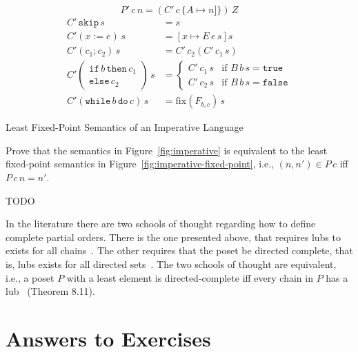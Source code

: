 \documentclass{tufte-handout}
\newcommand{\ASSIGN}[2]{#1 \mathrel{:=} #2}
\newcommand{\SEQ}[2]{#1 \mathrel{;} #2}
\newcommand{\SKIP}[0]{\mathtt{skip}}
\newcommand{\WHILE}[2]{\mathtt{while}\,#1\,\mathtt{do}\,#2}
\newcommand{\TRUE}[0]{\mathtt{true}}
\newcommand{\FALSE}[0]{\mathtt{false}}
\begin{document}
\begin{marginfigure}
\[
P'\,c\,n = (C'\,c\,\{A{\mapsto} n]\})\,Z 
\]
\begin{align*}
C'\,\SKIP\,s &= s \\ 
C'(\ASSIGN{x}{e})\,s &= [x\mapsto E\,e\,s]s\\
C'(\SEQ{c_1}{c_2})\,s &=  C'\,c_2(C'\,c_1\,s) \\
C'\left(\!\!\begin{array}{l}
  \mathtt{if}\,b\,\mathtt{then}\,c_1\\
  \mathtt{else}\,c_2
  \end{array}\!\!\right)\,s
  &= 
 \begin{cases}
  C'\,c_1\,s & \text{if } B\,b\,s = \TRUE \\
  C'\,c_2\,s & \text{if } B\,b\,s = \FALSE
 \end{cases} \\
C'(\WHILE{b}{c})\,s &= \mathrm{fix}(F_{b,c})\,s
\end{align*}
\caption{Least Fixed-Point Semantics of an Imperative Language}
\label{fig:imperative-fixed-point}
\end{marginfigure}


\begin{Exercise}
  Prove that the semantics in Figure~\ref{fig:imperative} is
  equivalent to the least fixed-point semantics in
  Figure~\ref{fig:imperative-fixed-point}, i.e., $(n,n') \in P\,c$ iff
  $P\,c\,n = n'$.
\end{Exercise}
\begin{Answer}
TODO
\end{Answer}

In the literature there are two schools of thought regarding how to
define complete partial orders. There is the one presented above, that
requires lubs to exists for all
chains~\citep{Plotkin:1983aa,Schmidt:1986vn,Winskel:1993uq}.  The
other requires that the poset be directed complete, that is, lubs
exists for all directed
sets~\citep{Gunter:1990aa,Mitchell:1996nn,Amadio:1998fk}.  The two
schools of thought are equivalent, i.e., a poset $P$ with a least
element is directed-complete iff every chain in $P$ has a
lub~\citep{Davey:2002fj} (Theorem 8.11).


\clearpage
\pagebreak

\section*{Answers to Exercises}

\shipoutAnswer

\clearpage
\pagebreak



\end{document}
